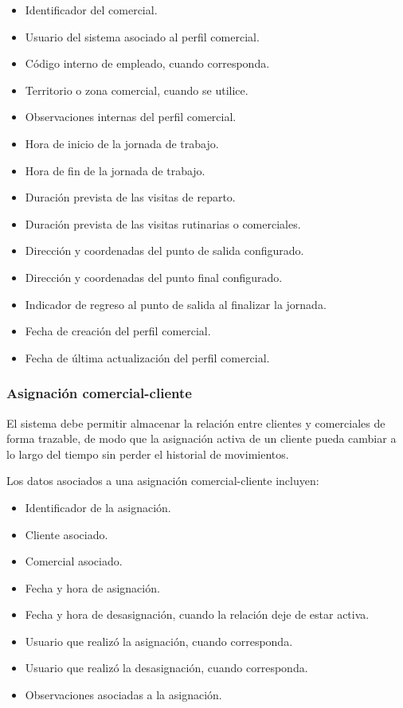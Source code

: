 \begin{itemize}
    \item Identificador del comercial.
    \item Usuario del sistema asociado al perfil comercial.
    \item Código interno de empleado, cuando corresponda.
    \item Territorio o zona comercial, cuando se utilice.
    \item Observaciones internas del perfil comercial.
    \item Hora de inicio de la jornada de trabajo.
    \item Hora de fin de la jornada de trabajo.
    \item Duración prevista de las visitas de reparto.
    \item Duración prevista de las visitas rutinarias o comerciales.
    \item Dirección y coordenadas del punto de salida configurado.
    \item Dirección y coordenadas del punto final configurado.
    \item Indicador de regreso al punto de salida al finalizar la jornada.
    \item Fecha de creación del perfil comercial.
    \item Fecha de última actualización del perfil comercial.
\end{itemize}

\subsubsection*{Asignación comercial-cliente}

El sistema debe permitir almacenar la relación entre clientes y comerciales de forma trazable, de modo que la asignación activa de un cliente pueda cambiar a lo largo del tiempo sin perder el historial de movimientos.

Los datos asociados a una asignación comercial-cliente incluyen:

\begin{itemize}
    \item Identificador de la asignación.
    \item Cliente asociado.
    \item Comercial asociado.
    \item Fecha y hora de asignación.
    \item Fecha y hora de desasignación, cuando la relación deje de estar activa.
    \item Usuario que realizó la asignación, cuando corresponda.
    \item Usuario que realizó la desasignación, cuando corresponda.
    \item Observaciones asociadas a la asignación.
\end{itemize}


